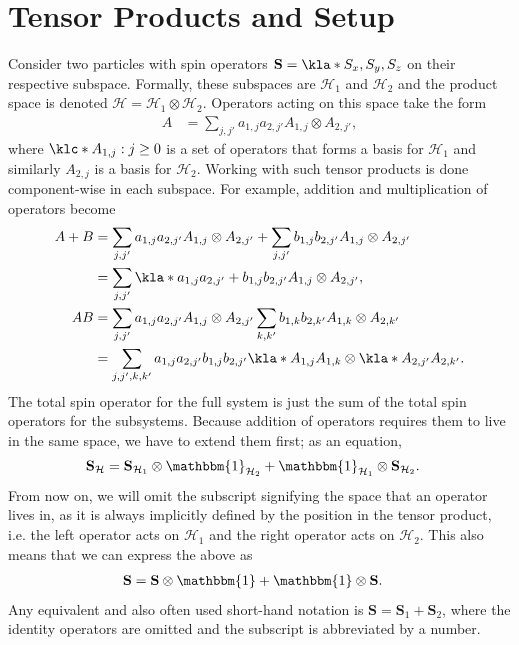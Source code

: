 \documentclass[english, parskip=full]{scrartcl}
\title{\Title}
\author{\Author}
\date{\today}
\begin{document}
\maketitle  %

\section{Tensor Products and Setup}
Consider two particles with spin operators $\textbf{S}=\kla*{S_x,S_y,S_z}$ on their respective subspace.
Formally, these subspaces are $\mathcal{H}_1$ and $\mathcal{H}_2$ and the product space is denoted $\mathcal{H} = \mathcal{H}_1 \otimes \mathcal{H}_2$.
Operators acting on this space take the form
\begin{align}
A &= \sum_{j,j'} a_{1,j} a_{2,j'} A_{1,j} \otimes A_{2,j'},
\end{align}
where $\klc*{A_{1,j} : j \ge 0}$ is a set of operators that forms a basis for $\mathcal{H}_1$ and similarly $A_{2,j}$ is a basis for $\mathcal{H}_2$.
Working with such tensor products is done component-wise in each subspace.
For example, addition and multiplication of operators become
\begin{align}
A + B &= \sum_{j,j'} a_{1,j} a_{2,j'} A_{1,j} \otimes A_{2,j'} + \sum_{j,j'} b_{1,j} b_{2,j'} A_{1,j} \otimes A_{2,j'}\\
&= \sum_{j,j'} \kla*{a_{1,j} a_{2,j'} + b_{1,j} b_{2,j'}} A_{1,j} \otimes A_{2,j'},\\
AB &= \sum_{j,j'} a_{1,j} a_{2,j'} A_{1,j} \otimes A_{2,j'} \sum_{k,k'} b_{1,k} b_{2,k'} A_{1,k} \otimes A_{2,k'}\\
&= \sum_{j,j',k,k'} a_{1,j} a_{2,j'}b_{1,j} b_{2,j'} \kla*{A_{1,j} A_{1,k}} \otimes \kla*{A_{2,j'} A_{2,k'}}.
\end{align}
The total spin operator for the full system is just the sum of the total spin operators for the subsystems.
Because addition of operators requires them to live in the same space, we have to extend them first; as an equation,
\begin{align}
\textbf{S}_\mathcal{H} &= \textbf{S}_{\mathcal{H}_1} \otimes \mathbbm{1}_{\mathcal{H}_2} + \mathbbm{1}_{\mathcal{H}_1} \otimes \textbf{S}_{\mathcal{H}_2}.
\end{align}
From now on, we will omit the subscript signifying the space that an operator lives in, as it is always implicitly defined by the position in the tensor product, i.e. the left operator acts on $\mathcal{H}_1$ and the right operator acts on $\mathcal{H}_2$.
This also means that we can express the above as
\begin{align}
\textbf{S} &= \textbf{S} \otimes \mathbbm{1} + \mathbbm{1} \otimes \textbf{S}.
\end{align}
Any equivalent and also often used short-hand notation is $\textbf{S} = \textbf{S}_1 + \textbf{S}_2$, where the identity operators are omitted and the subscript is abbreviated by a number.
\end{document}
